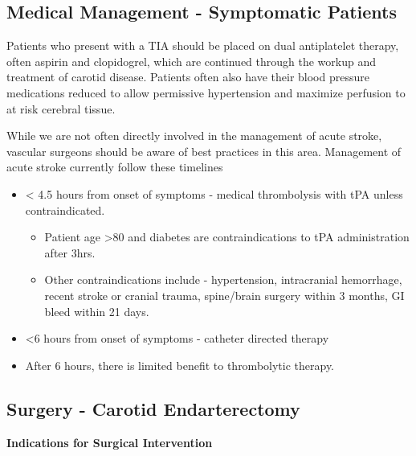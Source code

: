 \documentclass[
]{book}
\providecommand{\tightlist}{%
  \setlength{\itemsep}{0pt}\setlength{\parskip}{0pt}}
\begin{document}
\hypertarget{medical-management---symptomatic-patients}{%
\subsection{Medical Management - Symptomatic Patients}\label{medical-management---symptomatic-patients}}

Patients who present with a TIA should be placed on dual antiplatelet
therapy, often aspirin and clopidogrel, which are continued through the
workup and treatment of carotid disease. Patients often also have their
blood pressure medications reduced to allow permissive hypertension and
maximize perfusion to at risk cerebral tissue.

While we are not often directly involved in the management of acute
stroke, vascular surgeons should be aware of best practices in this
area. Management of acute stroke currently follow these
timelines\citep{powers2018GuidelinesEarly2018}

\begin{itemize}
\item
  \textless{} 4.5 hours from onset of symptoms - medical thrombolysis with tPA
  unless contraindicated.

  \begin{itemize}
  \tightlist
  \item
    Patient age \textgreater80 and diabetes are contraindications to tPA
    administration after 3hrs.
  \item
    Other contraindications include - hypertension, intracranial
    hemorrhage, recent stroke or cranial trauma, spine/brain surgery
    within 3 months, GI bleed within 21 days.
  \end{itemize}
\item
  \textless6 hours from onset of symptoms - catheter directed therapy
\item
  After 6 hours, there is limited benefit to thrombolytic therapy.
\end{itemize}

\hypertarget{surgery---carotid-endarterectomy}{%
\subsection{Surgery - Carotid Endarterectomy}\label{surgery---carotid-endarterectomy}}

\textbf{Indications for Surgical Intervention}
\end{document}
